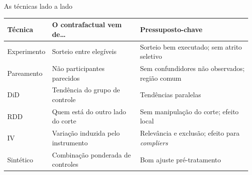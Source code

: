 \begin{frame}{As técnicas lado a lado}
  \scriptsize
  \renewcommand{\arraystretch}{1.25}
  \begin{tabularx}{\textwidth}{@{}p{1.5cm}>{\raggedright\arraybackslash}X>{\raggedright\arraybackslash}X@{}}
    \toprule
    \textbf{Técnica} & \textbf{O contrafactual vem de\ldots} & \textbf{Pressuposto-chave} \\ \midrule
    Experimento & Sorteio entre elegíveis & Sorteio bem executado; sem atrito seletivo \\
    Pareamento & Não participantes parecidos & Sem confundidores não observados; região comum \\
    DiD & Tendência do grupo de controle & Tendências paralelas \\
    RDD & Quem está do outro lado do corte & Sem manipulação do corte; efeito local \\
    IV & Variação induzida pelo instrumento & Relevância e exclusão; efeito para \emph{compliers} \\
    Sintético & Combinação ponderada de controles & Bom ajuste pré-tratamento \\ \bottomrule
  \end{tabularx}
\end{frame}

